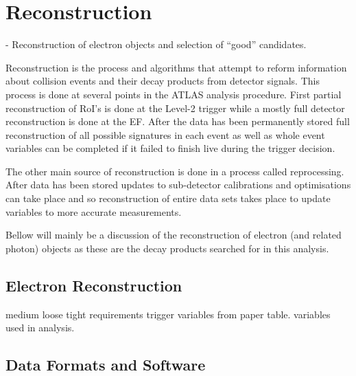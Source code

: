 \chapter{Reconstruction}
{\normalsize - Reconstruction of electron objects and selection of ``good'' candidates.}

Reconstruction is the process and algorithms that attempt to reform information about collision events and their decay products from detector signals. This process is done at several points in the ATLAS analysis procedure. First partial reconstruction of RoI's is done at the Level-2 trigger while a mostly full detector reconstruction is done at the EF. After the data has been permanently stored full reconstruction of all possible signatures in each event as well as whole event variables can be completed if it failed to finish live during the trigger decision.

The other main source of reconstruction is done in a process called reprocessing. After data has been stored updates to sub-detector calibrations and optimisations can take place and so reconstruction of entire data sets takes place to update variables to more accurate measurements. 


Bellow will mainly be a discussion of the reconstruction of electron (and related photon) objects as these are the decay products searched for in this analysis.



\section{Electron Reconstruction}
\label{sec:ReconElec}


	medium loose tight requirements
	trigger variables from paper table.
	variables used in analysis.
	



\section{Data Formats and Software}